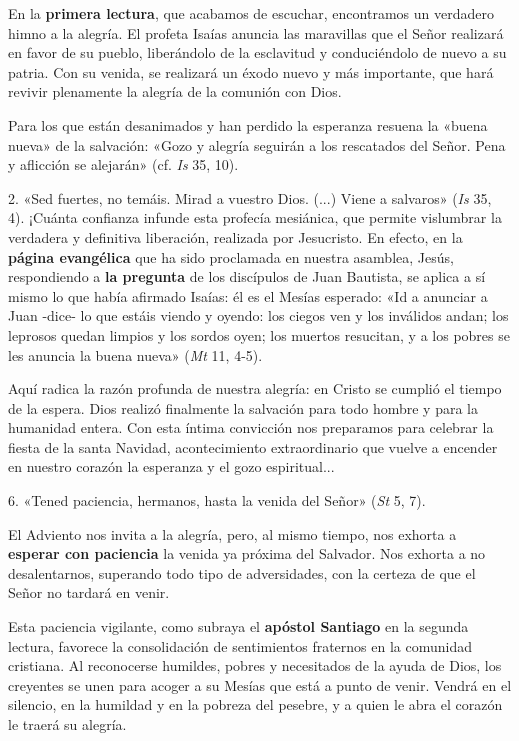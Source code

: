 \documentclass[]{article}
\begin{document}
En la \textbf{primera lectura}, que acabamos de escuchar, encontramos un
verdadero himno a la alegría. El profeta Isaías anuncia las maravillas
que el Señor realizará en favor de su pueblo, liberándolo de la
esclavitud y conduciéndolo de nuevo a su patria. Con su venida, se
realizará un éxodo nuevo y más importante, que hará revivir plenamente
la alegría de la comunión con Dios.

Para los que están desanimados y han perdido la esperanza resuena la
«buena nueva» de la salvación: «Gozo y alegría seguirán a los rescatados
del Señor. Pena y aflicción se alejarán» (cf. \emph{Is} 35, 10).

2. «Sed fuertes, no temáis. Mirad a vuestro Dios. (...) Viene a
salvaros» (\emph{Is} 35, 4). ¡Cuánta confianza infunde esta profecía
mesiánica, que permite vislumbrar la verdadera y definitiva liberación,
realizada por Jesucristo. En efecto, en la \textbf{página evangélica}
que ha sido proclamada en nuestra asamblea, Jesús, respondiendo a
\textbf{la pregunta} de los discípulos de Juan Bautista, se aplica a sí
mismo lo que había afirmado Isaías: él es el Mesías esperado: «Id a
anunciar a Juan -dice- lo que estáis viendo y oyendo: los ciegos ven y
los inválidos andan; los leprosos quedan limpios y los sordos oyen; los
muertos resucitan, y a los pobres se les anuncia la buena nueva»
(\emph{Mt} 11, 4-5).

Aquí radica la razón profunda de nuestra alegría: en Cristo se cumplió
el tiempo de la espera. Dios realizó finalmente la salvación para todo
hombre y para la humanidad entera. Con esta íntima convicción nos
preparamos para celebrar la fiesta de la santa Navidad, acontecimiento
extraordinario que vuelve a encender en nuestro corazón la esperanza y
el gozo espiritual...

6. «Tened paciencia, hermanos, hasta la venida del Señor» (\emph{St} 5,
7).

El Adviento nos invita a la alegría, pero, al mismo tiempo, nos exhorta
a \textbf{esperar con paciencia} la venida ya próxima del Salvador. Nos
exhorta a no desalentarnos, superando todo tipo de adversidades, con la
certeza de que el Señor no tardará en venir.

Esta paciencia vigilante, como subraya el \textbf{apóstol Santiago} en
la segunda lectura, favorece la consolidación de sentimientos fraternos
en la comunidad cristiana. Al reconocerse humildes, pobres y necesitados
de la ayuda de Dios, los creyentes se unen para acoger a su Mesías que
está a punto de venir. Vendrá en el silencio, en la humildad y en la
pobreza del pesebre, y a quien le abra el corazón le traerá su alegría.
\end{document}
